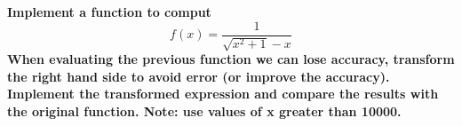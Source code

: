 \item \textbf{Implement a function to comput
    \begin{equation*}
        f(x)=\frac{1}{\sqrt{x^2+1}-x}
    \end{equation*}
    When evaluating the previous function we can lose accuracy, transform the right hand side to avoid error (or improve the accuracy). Implement the transformed expression and compare the results with the original function. Note: use values of x greater than 10000.}